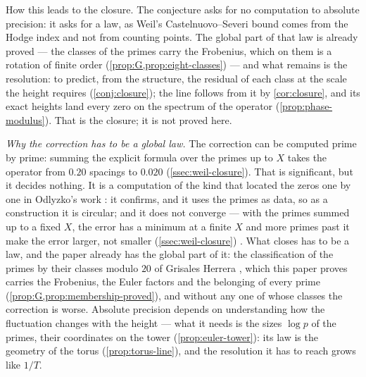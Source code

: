 How this leads to the closure.  The conjecture asks for no computation to absolute precision:
it asks for a law, as Weil's Castelnuovo--Severi bound comes from the Hodge index and not from
counting points.  The global part of that law is already proved --- the classes of the primes
carry the Frobenius, which on them is a rotation of finite order (\cref{prop:G,prop:eight-classes})
--- and what remains is the resolution: to predict, from the structure, the residual of each class
at the scale the height requires (\cref{conj:closure}); the line follows from it by \cref{cor:closure}, and its exact heights land every zero on the
spectrum of the operator (\cref{prop:phase-modulus}).  That is the
closure; it is not proved here.

\emph{Why the correction has to be a global law.}  The correction can be computed prime by prime:
summing the explicit formula over the primes up to $X$ takes the operator from $0.20$ spacings to
$0.020$ (\cref{ssec:weil-closure}).  That is significant, but it decides nothing.  It is a
computation of the kind that located the zeros one by one in Odlyzko's work \cite{odlyzko87}: it
confirms, and it uses the primes as data, so as a construction it is circular; and it does not
converge --- with the primes summed up to a fixed $X$, the error has a minimum at a finite $X$ and more primes past it make the
error larger, not smaller (\cref{ssec:weil-closure}) .  What closes has
to be a law, and the paper already has the global part of it: the classification of the primes
by their classes modulo $20$ of Grisales Herrera \cite{grisales25}, which this paper proves carries
the Frobenius, the Euler factors and the belonging of every prime
(\cref{prop:G,prop:membership-proved}), and without any one of whose classes the
correction is worse.  Absolute precision depends on understanding how the fluctuation changes with the height --- what it
needs is the sizes $\log p$ of the primes, their coordinates on the tower (\cref{prop:euler-tower}): its law is the geometry of the torus (\cref{prop:torus-line}), and the resolution
it has to reach grows like $1/T$.

